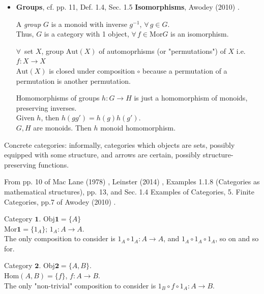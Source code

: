 \begin{itemize}
See 5.3.14 Record Types and 5.7.6, 14.2 for flow of control in Barr and Wells (2012) \cite{agat:BaWe2012} to complete the programming language. For here, see section \ref{agat:SubSubSec:RecordTypesProduct}

\item \textbf{Groups}, cf. pp. 11, Def. 1.4, Sec. 1.5 \textbf{Isomorphisms}, Awodey (2010) \cite{agat:Awod2010}.

A \emph{group} $G$ is a monoid with inverse $g^{-1}$, $\forall \, g \in G$. \\
Thus, $G$ is a category with 1 object, $\forall \, f \in \text{Mor}G$ is an isomorphism.

$\forall \, $ set $X$, group $\text{Aut}(X)$ of automoprhisms (or "permutations") of $X$ i.e. $f:X\to X$ \\
$\text{Aut}(X)$ is closed under composition $\circ$ because a permutation of a permutation is another permutation.

Homomorphisms of groups $h: G\to H$ is just a homomorphism of monoids, preserving inverses.\\
Given $h$, then $h(gg') = h(g) h(g')$. \\
$G,H$ are monoids. Then $h$ monoid homomorphism.
\end{itemize}

Concrete categories: informally, categories which objects are sets, possibly equipped with some structure, and arrows are certain, possibly structure-preserving functions.

From pp. 10 of Mac Lane (1978) \cite{agat:MacL1978}, Leinster (2014) \cite{agat:Lein2014}, Examples 1.1.8 (Categories as mathematical structures), pp. 13, and Sec. 1.4 Examples of Categories, 5. Finite Categories, pp.7 of Awodey (2010) \cite{agat:Awod2010}.

Category $\mathbf{1}$.  $\text{Obj}{\mathbf{1}} = \lbrace A \rbrace$ \\
$\text{Mor}{\mathbf{1}} = \lbrace 1_A \rbrace$; $1_A : A \to A$.  \\

The only composition to consider is $1_A \circ 1_A : A \to A$, and $1_A \circ 1_A \circ 1_A$, so on and so for.

Category $\mathbf{2}$.  $\text{Obj}{\mathbf{2}} = \lbrace A, B \rbrace$. \\
$\text{Hom}(A, B) = \lbrace f \rbrace$, $f:A\to B$. \\

The only "non-trivial" composition to consider is $1_B \circ f \circ 1_A : A \to B$. \\
 

